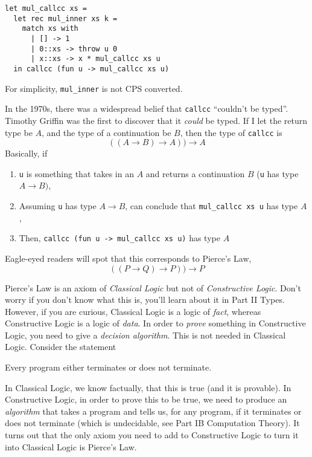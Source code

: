 \begin{code}
\label{code:mul-ocaml-callcc}
\begin{verbatim}
let mul_callcc xs = 
  let rec mul_inner xs k = 
    match xs with
      | [] -> 1
      | 0::xs -> throw u 0
      | x::xs -> x * mul_callcc xs u
  in callcc (fun u -> mul_callcc xs u)
\end{verbatim}
\end{code}

For simplicity, \texttt{mul\_inner} is not CPS converted. 

In the 1970s, there was a widespread belief that \texttt{callcc} ``couldn't be typed''. Timothy Griffin was the first to discover that it \emph{could} be typed. If I let the return type be $A$, and the type of a continuation be $B$, then the type of \texttt{callcc} is
\[((A \rightarrow B) \rightarrow A)) \rightarrow A\]
Basically, if
\begin{enumerate}
    \item \texttt{u} is something that takes in an $A$ and returns a continuation $B$ (\texttt{u} has type $A \rightarrow B)$,
    \item Assuming \texttt{u} has type $A \rightarrow B$, can conclude that \texttt{mul\_callcc xs u} has type $A$,
    \item Then, \texttt{callcc (fun u -> mul\_callcc xs u)} has type $A$
\end{enumerate} 

Eagle-eyed readers will spot that this corresponds to Pierce's Law, 
\[((P \rightarrow Q) \rightarrow P)) \rightarrow P\]

Pierce's Law is an axiom of \emph{Classical Logic} but not of \emph{Constructive Logic}. Don't worry if you don't know what this is, you'll learn about it in {\sffamily Part II Types}. However, if you are curious, Classical Logic is a logic of \emph{fact}, whereas Constructive Logic is a logic of \emph{data}. In order to \emph{prove} something in Constructive Logic, you need to give a \emph{decision algorithm}. This is not needed in Classical Logic. Consider the statement 

\begin{center}
    Every program either terminates or does not terminate.
\end{center}

In Classical Logic, we know factually, that this is true (and it is provable). In Constructive Logic, in order to prove this to be true, we need to produce an \emph{algorithm} that takes a program and tells us, for any program, if it terminates or does not terminate (which is undecidable, see {\sffamily Part IB Computation Theory}). It turns out that the only axiom you need to add to Constructive Logic to turn it into Classical Logic is Pierce's Law. 

